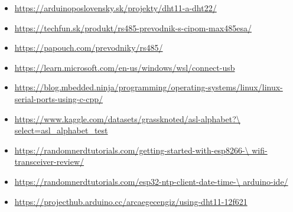\documentclass[a4paper, 12pt]{article}
\begin{document}
\begin{itemize}
    \item \url{https://arduinoposlovensky.sk/projekty/dht11-a-dht22/}
    \item \url{https://techfun.sk/produkt/rs485-prevodnik-s-cipom-max485esa/}
    \item \url{https://papouch.com/prevodniky/rs485/}
    \item \url{https://learn.microsoft.com/en-us/windows/wsl/connect-usb}
    \item \url{https://blog.mbedded.ninja/programming/operating-systems/linux/linux-serial-ports-using-c-cpp/}
    \item \url{https://www.kaggle.com/datasets/grassknoted/asl-alphabet?\
    select=asl_alphabet_test}
    \item \url{https://randomnerdtutorials.com/getting-started-with-esp8266-\
    wifi-transceiver-review/}
    \item \url{https://randomnerdtutorials.com/esp32-ntp-client-date-time-\
    arduino-ide/}
    \item \url{https://projecthub.arduino.cc/arcaegecengiz/using-dht11-12f621}
\end{itemize}
\end{document}
